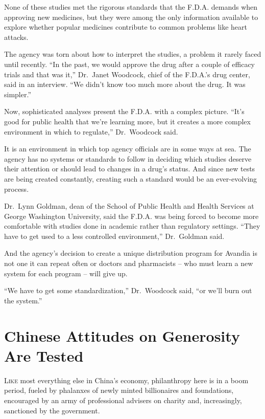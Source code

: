 ﻿\documentclass[12pt]{article}
\begin{document}
None of these studies met the rigorous standards that the F.D.A. demands when approving new
medicines, but they were among the only information available to explore whether popular medicines
contribute to common problems like heart attacks.

The agency was torn about how to interpret the studies, a problem it rarely faced until recently.
``In the past, we would approve the drug after a couple of efficacy trials and that was it,''
Dr.~Janet Woodcock, chief of the F.D.A.'s drug center, said in an interview. ``We didn't know too
much more about the drug. It was simpler.''

Now, sophisticated analyses present the F.D.A. with a complex picture. ``It's good for public health
that we're learning more, but it creates a more complex environment in which to regulate,''
Dr.~Woodcock said.

It is an environment in which top agency officials are in some ways at sea. The agency has no
systems or standards to follow in deciding which studies deserve their attention or should lead to
changes in a drug's status. And since new tests are being created constantly, creating such a
standard would be an ever-evolving process.

Dr.~Lynn Goldman, dean of the School of Public Health and Health Services at George Washington
University, said the F.D.A. was being forced to become more comfortable with studies done in
academic rather than regulatory settings. ``They have to get used to a less controlled
environment,'' Dr.~Goldman said.

And the agency's decision to create a unique distribution program for Avandia is not one it can
repeat often or doctors and pharmacists -- who must learn a new system for each program -- will give
up.

``We have to get some standardization,'' Dr.~Woodcock said, ``or we'll burn out the system.''

\pagebreak
\section{Chinese Attitudes on Generosity Are Tested}

\lettrine{L}{ike} most everything else in China's economy, philanthropy
here is in a boom period, fueled by phalanxes of newly minted billionaires and foundations,
encouraged by an army of professional advisers on charity and, increasingly, sanctioned by the
government.
\end{document}
